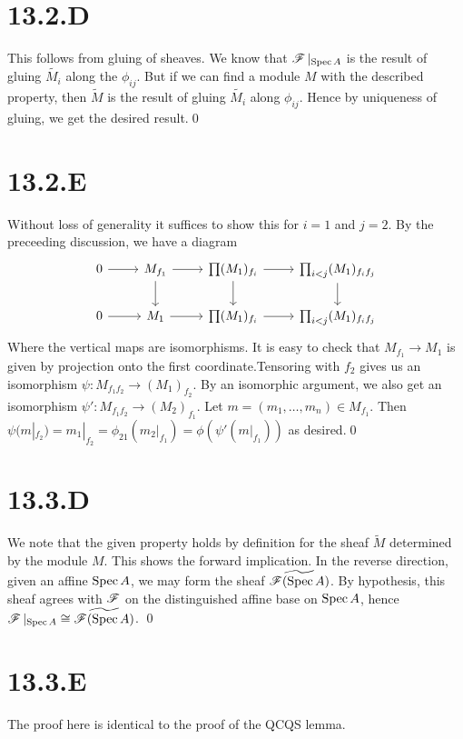 \documentclass{article}
\begin{document}
\section*{13.2.D}
This follows from gluing of sheaves. We know that $\operatorname{\mathscr{F}}|_{\operatorname{Spec} A}$ is
the result of gluing $\widetilde{M_i}$ along the $\phi_{ij}$.
But if we can find a module $M$ with the described
property, then $\widetilde{M}$ is the result of gluing
$\widetilde{M_i}$ along $\phi_{ij}$. Hence by uniqueness of
gluing, we get the desired result.\qed

\section*{13.2.E}
Without loss of generality it suffices to show this for $i=1$
and $j=2$. By the preceeding discussion, we have a diagram
\[\begin{tikzcd}
        0 & {M_{f_1}} & {\prod (M_1)_{f_i}} & {\prod_{i<j} (M_1)_{f_if_j}} \\
        0 & {M_1}     & {\prod (M_1)_{f_i}} & {\prod_{i<j} (M_1)_{f_if_j}}
        \arrow[from=1-1, to=1-2]
        \arrow[from=1-2, to=1-3]
        \arrow[from=1-3, to=1-4]
        \arrow[from=2-2, to=2-3]
        \arrow[from=2-3, to=2-4]
        \arrow[from=2-1, to=2-2]
        \arrow[from=1-2, to=2-2]
        \arrow[from=1-3, to=2-3]
        \arrow[from=1-4, to=2-4]
    \end{tikzcd}\] Where the vertical maps are isomorphisms. It is easy to
check that $M_{f_1} \to M_1$ is given by projection onto the first
coordinate.Tensoring with $f_2$ gives us an isomorphism
$\psi: M_{f_1f_2} \to (M_1)_{f_2}$. By an isomorphic argument, we also get an isomorphism
$\psi': M_{f_1f_2} \to (M_2)_{f_1}$. Let $m=(m_1, \dots , m_n) \in M_{f_1}$. Then
$\psi(m|_{f_2})=m_1|_{f_2}=\phi_{21}(m_2|_{f_1})=\phi(\psi'(m|_{f_1}))$ as desired.\qed

\section*{13.3.D}
We note that the given property holds by definition for the sheaf
$\widetilde{M}$ determined by the module $M$. This
shows the forward implication. In the reverse direction, given an affine
$\operatorname{Spec} A$, we may form the sheaf $\widetilde{\operatorname{\mathscr{F}}(\operatorname{Spec} A)}$. By
hypothesis, this sheaf agrees with $\operatorname{\mathscr{F}}$ on the distinguished
affine base on $\operatorname{Spec} A$, hence $\operatorname{\mathscr{F}}|_{\operatorname{Spec} A} \cong \widetilde{\operatorname{\mathscr{F}}(\operatorname{Spec} A)}$. \qed

\section*{13.3.E}
The proof here is identical to the proof of the QCQS lemma.
\end{document}
